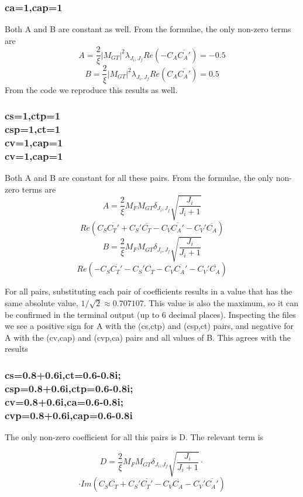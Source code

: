 \documentclass[twocolumn]{article}
\begin{document}
\subsubsection*{ca=1,cap=1}

Both A and B are constant as well. From the formulae, the only non-zero terms are 
$$A = \frac{2}{\xi}|M_{GT}|^2\lambda_{J_i,J_f}Re(-C_A\overline{C_A'}) = -0.5$$
$$B = \frac{2}{\xi}|M_{GT}|^2\lambda_{J_i,J_f}Re(C_A\overline{C_A'}) = 0.5$$
From the code we reproduce this results as well.

\subsubsection*{cs=1,ctp=1\\csp=1,ct=1\\cv=1,cap=1\\cv=1,cap=1}

Both A and B are constant for all these pairs. From the formulae, the only non-zero terms are 
$$A = \frac{2}{\xi}M_FM_{GT}\delta_{J_i,J_f}\sqrt{\frac{J_i}{J_i+1}}$$$$ Re(C_S\overline{C_T'}+C_S'\overline{C_T}-C_V\overline{C_A'}-C_V'\overline{C_A})$$
$$B = \frac{2}{\xi}M_FM_{GT}\delta_{J_i,J_f}\sqrt{\frac{J_i}{J_i+1}}$$$$ Re(-C_S\overline{C_T'}-C_S'\overline{C_T}-C_V\overline{C_A'}-C_V'\overline{C_A})$$

For all pairs, substituting each pair of coefficients results in a value that has the same absolute value, $1/\sqrt{2} \approx 0.707107$. This value is also the maximum, so it can be confirmed in the terminal output (up to 6 decimal places). Inspecting the files we see a positive sign for A with the (cs,ctp) and (csp,ct) pairs, and negative for A with the (cv,cap) and (cvp,ca) pairs and all values of B. This agrees with the results

\subsubsection*{cs=0.8+0.6i,ct=0.6-0.8i;\\csp=0.8+0.6i,ctp=0.6-0.8i;\\cv=0.8+0.6i,ca=0.6-0.8i;\\cvp=0.8+0.6i,cap=0.6-0.8i}

The only non-zero coefficient for all this pairs is D. The relevant term is

$$D = \frac{2}{\xi}M_FM_{GT}\delta_{J_i,J_f}\sqrt{\frac{J_i}{J_i+1}}\cdot$$$$ \cdot Im(C_S\overline{C_T}+C_S'\overline{C_T'}-C_V\overline{C_A}-C_V'\overline{C_A'})$$
\end{document}

